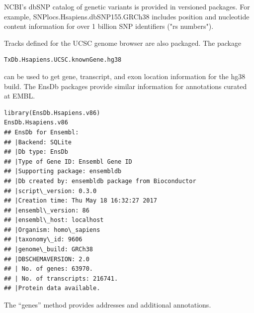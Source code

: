 \documentclass[graybox]{svmult}
\begin{document}
NCBI's dbSNP catalog of genetic variants is provided
in versioned packages.
For example, SNPlocs.Hsapiens.dbSNP155.GRCh38 includes
position and nucleotide content information for over
1 billion SNP identifiers ("rs numbers").

Tracks defined for the UCSC genome browser are also
packaged. The package 
\begin{verbatim}
TxDb.Hsapiens.UCSC.knownGene.hg38 
\end{verbatim} 
can be
used to get gene, transcript, and exon location information
for the hg38 build. The EnsDb packages provide similar
information for annotations curated at EMBL.


\begin{shaded}
\begin{verbatim}
library(EnsDb.Hsapiens.v86)
EnsDb.Hsapiens.v86
## EnsDb for Ensembl:
## |Backend: SQLite
## |Db type: EnsDb
## |Type of Gene ID: Ensembl Gene ID
## |Supporting package: ensembldb
## |Db created by: ensembldb package from Bioconductor
## |script\_version: 0.3.0
## |Creation time: Thu May 18 16:32:27 2017
## |ensembl\_version: 86
## |ensembl\_host: localhost
## |Organism: homo\_sapiens
## |taxonomy\_id: 9606
## |genome\_build: GRCh38
## |DBSCHEMAVERSION: 2.0
## | No. of genes: 63970.
## | No. of transcripts: 216741.
## |Protein data available.
\end{verbatim}
\end{shaded}


The ``genes'' method provides addresses and additional
annotations.
\end{document}
